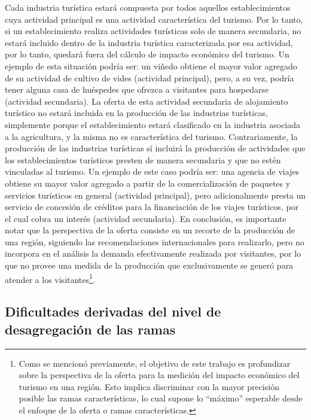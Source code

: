 \documentclass[
  openany]{book}
\begin{document}
Cada industria turística estará compuesta por todos aquellos establecimientos cuya actividad principal es una actividad característica del turismo. Por lo tanto, si un establecimiento realiza actividades turísticas solo de manera secundaria, no estará incluido dentro de la industria turística caracterizada por esa actividad, por lo tanto, quedará fuera del cálculo de impacto económico del turismo. Un ejemplo de esta situación podría ser: un viñedo obtiene el mayor valor agregado de su actividad de cultivo de vides (actividad principal), pero, a su vez, podría tener alguna casa de huéspedes que ofrezca a visitantes para hospedarse (actividad secundaria). La oferta de esta actividad secundaria de alojamiento turístico no estará incluida en la producción de las industrias turísticas, simplemente porque el establecimiento estará clasificado en la industria asociada a la agricultura, y la misma no es característica del turismo. Contrariamente, la producción de las industrias turísticas sí incluirá la producción de actividades que los establecimientos turísticos presten de manera secundaria y que no estén vinculadas al turismo. Un ejemplo de este caso podría ser: una agencia de viajes obtiene su mayor valor agregado a partir de la comercialización de paquetes y servicios turísticos en general (actividad principal), pero adicionalmente presta un servicio de concesión de créditos para la financiación de los viajes turísticos, por el cual cobra un interés (actividad secundaria). En conclusión, es importante notar que la perspectiva de la oferta consiste en un recorte de la producción de una región, siguiendo las recomendaciones internacionales para realizarlo, pero no incorpora en el análisis la demanda efectivamente realizada por visitantes, por lo que no provee una medida de la producción que exclusivamente se generó para atender a los visitantes\footnote{Como se mencionó previamente, el objetivo de este trabajo es profundizar sobre la perspectiva de la oferta para la medición del impacto económico del turismo en una región. Esto implica discriminar con la mayor precisión posible las ramas características, lo cual supone lo ``máximo'' esperable desde el enfoque de la oferta o ramas características.}.

\hypertarget{dificultades-derivadas-del-nivel-de-desagregaciuxf3n-de-las-ramas}{%
\subsection{Dificultades derivadas del nivel de desagregación de las ramas}\label{dificultades-derivadas-del-nivel-de-desagregaciuxf3n-de-las-ramas}}
\end{document}
